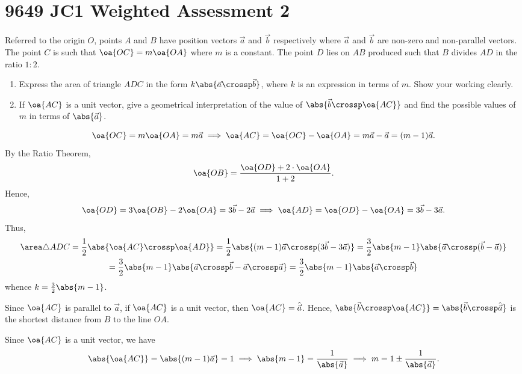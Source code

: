 \section{9649 JC1 Weighted Assessment 2}

\begin{problem}
    Referred to the origin $O$, points $A$ and $B$ have position vectors $\vec a$ and $\vec b$ respectively where $\vec a$ and $\vec b$ are non-zero and non-parallel vectors. The point $C$ is such that $\oa{OC} = m \oa{OA}$ where $m$ is a constant. The point $D$ lies on $AB$ produced such that $B$ divides $AD$ in the ratio $1 : 2$.

    \begin{enumerate}
        \item Express the area of triangle $ADC$ in the form $k \abs{\vec a \crossp \vec b}$, where $k$ is an expression in terms of $m$. Show your working clearly.
        \item If $\oa{AC}$ is a unit vector, give a geometrical interpretation of the value of $\abs{\vec b \crossp \oa{AC}}$ and find the possible values of $m$ in terms of $\abs{\vec a}$.
    \end{enumerate}
\end{problem}
\begin{solution}
    \begin{ppart}
        \[\oa{OC} = m\oa{OA} = m \vec a \implies \oa{AC} = \oa{OC} - \oa{OA} = m \vec a - \vec a = (m-1) \vec a.\] By the Ratio Theorem, \[\oa{OB} = \frac{\oa{OD} + 2 \cdot \oa{OA}}{1 + 2}.\] Hence, \[\oa{OD} = 3\oa{OB} - 2\oa{OA} = 3\vec b - 2 \vec a \implies \oa{AD} = \oa{OD} - \oa{OA} = 3\vec b - 3\vec a.\] Thus,
        \begin{gather*}
            \area \triangle ADC = \frac12 \abs{\oa{AC} \crossp \oa{AD}} = \frac12 \abs{(m-1)\vec a \crossp (3\vec b - 3\vec a)} = \frac32 \abs{m-1} \abs{\vec a \crossp (\vec b - \vec a)}\\
            = \frac32 \abs{m-1} \abs{\vec a \crossp \vec b - \vec a \crossp \vec a} = \frac32 \abs{m-1} \abs{\vec a \crossp \vec b}
        \end{gather*}
        whence $k = \frac32 \abs{m-1}$.
    \end{ppart}
    \begin{ppart}
        Since $\oa{AC}$ is parallel to $\vec a$, if $\oa{AC}$ is a unit vector, then $\oa{AC} = \hat{\vec a}$. Hence, $\abs{\vec b \crossp \oa{AC}} = \abs{\vec b \crossp \hat{\vec a}}$ is the shortest distance from $B$ to the line $OA$.

        Since $\oa{AC}$ is a unit vector, we have \[\abs{\oa{AC}} = \abs{(m-1) \vec a} = 1 \implies \abs{m-1} = \frac1{\abs{\vec a}} \implies m = 1 \pm \frac1{\abs{\vec a}}.\]
    \end{ppart}
\end{solution}

